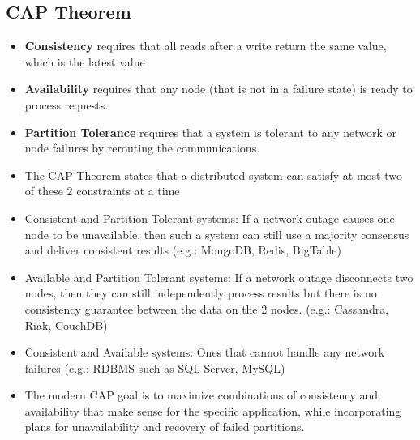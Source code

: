 \documentclass{article}
\begin{document}
\subsection{CAP Theorem}
\begin{itemize}
    \item \textbf{Consistency} requires that all reads after a write return the same value, which is the latest value
    
    \item \textbf{Availability} requires that any node (that is not in a failure state) is ready to process requests. 
    
    \item \textbf{Partition Tolerance} requires that a system is tolerant to any network or node failures by rerouting the communications.
    
    \item The CAP Theorem states that a distributed system can satisfy at most two of these 2 constraints at a time
    
    \item Consistent and Partition Tolerant systems: If a network outage causes one node to be unavailable, then such a system can still use a majority consensus and deliver consistent results (e.g.: MongoDB, Redis, BigTable)
    
    \item Available and Partition Tolerant systems: If a network outage disconnects two nodes, then they can still independently process results but there is no consistency guarantee between the data on the 2 nodes. (e.g.: Cassandra, Riak, CouchDB)
    
    \item Consistent and Available systems: Ones that cannot handle any network failures (e.g.: RDBMS such as SQL Server, MySQL)
    
    \item The modern CAP goal is to maximize combinations of consistency and availability that make sense for the specific application, while incorporating plans for unavailability and recovery of failed partitions. 
\end{itemize}
\end{document}

